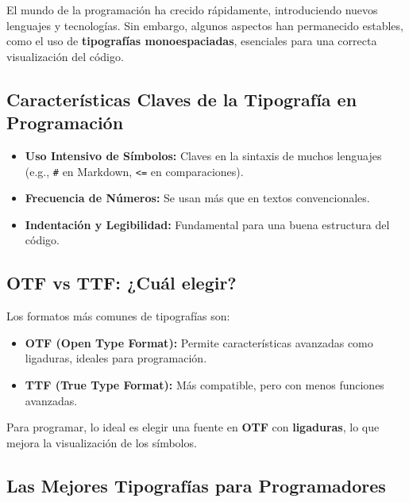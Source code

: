 \documentclass[
  jou,
  floatsintext,
  longtable,
  a4paper,
  nolmodern,
  notxfonts,
  notimes,
  12pt,
  colorlinks=true,linkcolor=blue,citecolor=blue,urlcolor=blue]{apa7}
\providecommand{\tightlist}{%
  \setlength{\itemsep}{0pt}\setlength{\parskip}{0pt}}
\begin{document}
El mundo de la programación ha crecido rápidamente, introduciendo nuevos
lenguajes y tecnologías. Sin embargo, algunos aspectos han permanecido
estables, como el uso de \textbf{tipografías monoespaciadas}, esenciales
para una correcta visualización del código.

\subsection{Características Claves de la Tipografía en
Programación}\label{caracteruxedsticas-claves-de-la-tipografuxeda-en-programaciuxf3n}

\begin{itemize}
\tightlist
\item
  \textbf{Uso Intensivo de Símbolos:} Claves en la sintaxis de muchos
  lenguajes (e.g., \texttt{\#} en Markdown, \texttt{\textless{}=} en
  comparaciones).\\
\item
  \textbf{Frecuencia de Números:} Se usan más que en textos
  convencionales.\\
\item
  \textbf{Indentación y Legibilidad:} Fundamental para una buena
  estructura del código.
\end{itemize}

\subsection{OTF vs TTF: ¿Cuál elegir?}\label{otf-vs-ttf-cuuxe1l-elegir}

Los formatos más comunes de tipografías son:

\begin{itemize}
\tightlist
\item
  \textbf{OTF (Open Type Format):} Permite características avanzadas
  como ligaduras, ideales para programación.\\
\item
  \textbf{TTF (True Type Format):} Más compatible, pero con menos
  funciones avanzadas.
\end{itemize}

Para programar, lo ideal es elegir una fuente en \textbf{OTF} con
\textbf{ligaduras}, lo que mejora la visualización de los símbolos.

\subsection{Las Mejores Tipografías para
Programadores}\label{las-mejores-tipografuxedas-para-programadores}
\end{document}
